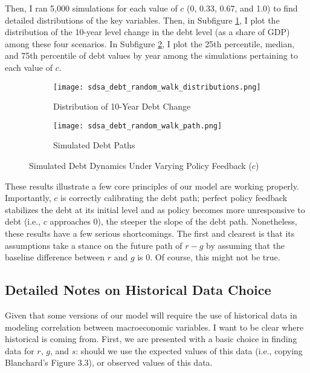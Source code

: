 \documentclass{article}
\begin{document}
Then, I ran 5,000 simulations for each value of $c$ (0, 0.33, 0.67, and 1.0) to find detailed distributions of the key variables. Then, in Subfigure \ref{subfig:random_walk_distribution}, I plot the distribution of the 10-year level change in the debt level (as a share of GDP) among these four scenarios. In Subfigure \ref{subfig:random_walk_debt_path}, I  plot the 25th percentile, median, and 75th percentile of debt values by year among the simulations pertaining to each value of $c$. 
\begin{figure}[htbp]
	\centering
	\begin{subfigure}[b]{0.45\textwidth}
		\texttt{[image: sdsa\_debt\_random\_walk\_distributions.png]}
		\caption{Distribution of 10-Year Debt Change}
		\label{subfig:random_walk_distribution}
	\end{subfigure}
	\hfill
	\begin{subfigure}[b]{0.45\textwidth}
		\texttt{[image: sdsa\_debt\_random\_walk\_path.png]}
		\caption{Simulated Debt Paths}
		\label{subfig:random_walk_debt_path}
	\end{subfigure}
	\caption{Simulated Debt Dynamics Under Varying Policy Feedback ($c$)}
	\label{fig:random_walk_sdsa}
\end{figure}

These results illustrate a few core principles of our model are working properly. Importantly, $c$ is correctly calibrating the debt path; perfect policy feedback stabilizes the debt at its initial level and as policy becomes more unresponsive to debt (i.e., $c$ approaches 0), the steeper the slope of the debt path. Nonetheless, these results have a few serious shortcomings. The first and clearest is that its assumptions take a stance on the future path of $r-g$ by assuming that the baseline difference between $r$ and $g$ is 0. Of course, this might not be true. 

\subsection{Detailed Notes on Historical Data Choice}
\label{sec:detailed_historical_data}

Given that some versions of our model will require the use of historical data in modeling correlation between macroeconomic variables. I want to be clear where historical is coming from. First, we are presented with a basic choice in finding data for $r$, $g$, and $s$: should we use the expected values of this data (i.e., copying Blanchard's Figure 3.3), or observed values of this data. 
\end{document}

